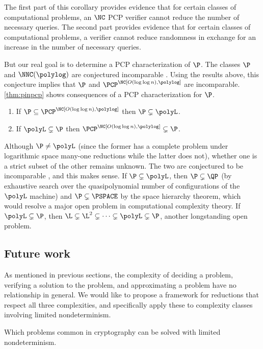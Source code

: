 \documentclass{article}
\begin{document}
The first part of this corollary provides evidence that for certain classes of computational problems, an $\NC$ PCP verifier cannot reduce the number of necessary queries.
The second part provides evidence that for certain classes of computational problems, a verifier cannot reduce randomness in exchange for an increase in the number of necessary queries.

But our real goal is to determine a PCP characterization of $\P$.
The classes $\P$ and $\NNC(\polylog)$ are conjectured incomparable \autocite{wolf94}.
Using the results above, this conjecture implies that $\P$ and $\PCP^\NC[O(\log \log n), \polylog]$ are incomparable.
\autoref{thm:pinpcp} shows consequences of a PCP characterization for $\P$.

\begin{theorem}\label{thm:pinpcp}
  \mbox{}
  \begin{enumerate}
  \item If $\P \subseteq \PCP^\NC[O(\log \log n), \polylog]$ then $\P \subsetneq \polyL$.
  \item If $\polyL \subsetneq \P$ then $\PCP^\NC[O(\log \log n), \polylog] \subsetneq \P$.
  \end{enumerate}
\end{theorem}
Although $\P \neq \polyL$ (since the former has a complete problem under logarithmic space many-one reductions while the latter does not), whether one is a strict subset of the other remains unknown.
The two are conjectured to be incomparable \autocite[Section~2.5.1]{johnson90}, and this makes sense.
If $\P \subsetneq \polyL$, then $\P \subsetneq \QP$ (by exhaustive search over the quasipolynomial number of configurations of the $\polyL$ machine) and $\P \subsetneq \PSPACE$ by the space hierarchy theorem, which would resolve a major open problem in computational complexity theory.
If $\polyL \subsetneq \P$, then $\L \subsetneq \L^2 \subsetneq \dotsb \subsetneq \polyL \subsetneq \P$, another longstanding open problem.

\subsection{Future work}

\begin{description}[style=nextline]
\item[Reductions respecting verification complexity \autocite{limndver}]
  As mentioned in previous sections, the complexity of deciding a problem, verifying a solution to the problem, and approximating a problem have no relationship in general.
  We would like to propose a framework for reductions that respect all three complexities, and specifically apply these to complexity classes involving limited nondeterminism.
\item[Cryptographic primitives in limited nondeterminism \autocite{timelock}]
  Which problems common in cryptography can be solved with limited nondeterminism.
\end{description}
\end{document}
